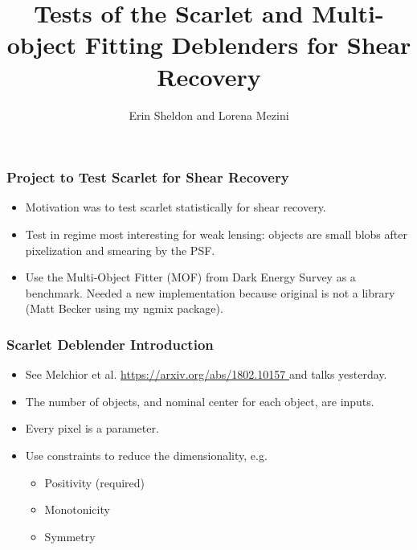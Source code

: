 \documentclass{beamer}
\title{Tests of the Scarlet and Multi-object Fitting Deblenders for
Shear Recovery}
\author{Erin Sheldon and Lorena Mezini}
\institute{Brookhaven National Laboratory, Stony Brook University}
\begin{document}
\frame{\titlepage}

\frame
{
    \frametitle{Project to Test Scarlet for Shear Recovery}

    \begin{itemize}

        \item Motivation was to test scarlet statistically for shear recovery.
            
        \item Test in regime most interesting for weak lensing:  objects
            are small blobs after pixelization and smearing by the PSF.

        \item Use the Multi-Object Fitter (MOF) from Dark Energy Survey as a
            benchmark.  Needed a new implementation because original is not a
            library (Matt Becker using my ngmix package).

    \end{itemize}

}



\frame
{
    \frametitle{Scarlet Deblender Introduction}

    \begin{itemize}

        \item See Melchior et al. \url{https://arxiv.org/abs/1802.10157 }
            and talks yesterday.

        \item The number of objects, and nominal center for each object, are inputs.

        \item Every pixel is a parameter.


        \item Use constraints to reduce the dimensionality, e.g.
        \begin{itemize}
            \item Positivity (required)
            \item Monotonicity
            \item Symmetry
        \end{itemize}

    \end{itemize}

}
\end{document}
